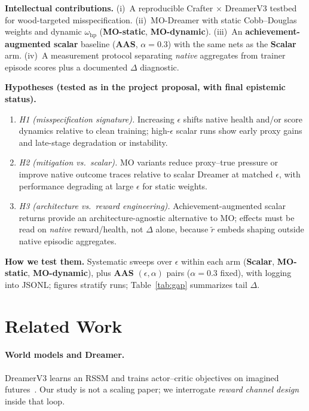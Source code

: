 \documentclass[10pt,twocolumn]{article}
\theoremstyle{definition}
\begin{document}
\textbf{Intellectual contributions.} (i)~A reproducible Crafter \(\times\) DreamerV3 testbed for wood-targeted misspecification. (ii)~MO-Dreamer with static Cobb--Douglas weights and dynamic \(\omega_{\mathrm{hp}}\) (\textbf{MO-static}, \textbf{MO-dynamic}). (iii)~An \textbf{achievement-augmented scalar} baseline (\textbf{AAS}, \(\alpha{=}0.3\)) with the same nets as the \textbf{Scalar} arm. (iv)~A measurement protocol separating \emph{native} aggregates from trainer episode scores plus a documented \(\Delta\) diagnostic.

\textbf{Hypotheses (tested as in the project proposal, with final epistemic status).}
\begin{enumerate}[label=\textbf{H\arabic*:}, leftmargin=1.4em, itemsep=1pt]
  \item \textit{H1 (misspecification signature).} Increasing \(\epsilon\) shifts native health and/or score dynamics relative to clean training; high-\(\epsilon\) scalar runs show early proxy gains and late-stage degradation or instability.
  \item \textit{H2 (mitigation vs.\ scalar).} MO variants reduce proxy--true pressure or improve native outcome traces relative to scalar Dreamer at matched \(\epsilon\), with performance degrading at large \(\epsilon\) for static weights.
  \item \textit{H3 (architecture vs.\ reward engineering).} Achievement-augmented scalar returns provide an architecture-agnostic alternative to MO; effects must be read on \emph{native} reward/health, not \(\Delta\) alone, because \(\tilde r\) embeds shaping outside native episodic aggregates.
\end{enumerate}

\textbf{How we test them.} Systematic sweeps over \(\epsilon\) within each arm (\textbf{Scalar}, \textbf{MO-static}, \textbf{MO-dynamic}), plus \textbf{AAS} \((\epsilon,\alpha)\) pairs (\(\alpha{=}0.3\) fixed), with logging into JSONL; figures stratify runs; Table~\ref{tab:gap} summarizes tail \(\Delta\).

\section{Related Work}
\paragraph{World models and Dreamer.} DreamerV3 learns an RSSM and trains actor--critic objectives on imagined futures~\cite{hafner2023dreamerv3}. Our study is not a scaling paper; we interrogate \emph{reward channel design} inside that loop.
\end{document}

